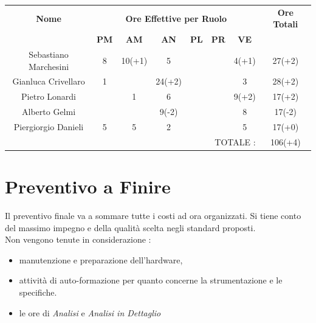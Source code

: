 \documentclass[12pt,a4paper,titlepage]{article}
\begin{document}
	{\renewcommand\arraystretch{1.2}  %
		\begin{tabular}{|c|c|c|c|c|c|c|c|}
		\hline 
		\textbf{Nome} & \multicolumn{6}{c|}{\textbf{Ore Effettive per Ruolo}} & \textbf{Ore Totali} \\ 
		& \textbf{PM} & \textbf{AM} & \textbf{AN} & \textbf{PL} & \textbf{PR} & \textbf{VE} & \\ 
		\hline
		Sebastiano Marchesini & 8 & 10(+1) & 5 &  &  & 4(+1) & 27(+2) \\ 
		\hline 
		Gianluca Crivellaro & 1 &  & 24(+2) &  &  & 3 & 28(+2) \\ 
		\hline 
		Pietro Lonardi &  & 1 & 6 &  &  & 9(+2) & 17(+2) \\ 
		\hline 
		Alberto Gelmi &  &  & 9(-2) &  &  & 8 & 17(-2) \\ 
		\hline 
		Piergiorgio Danieli & 5 & 5 & 2 &  &  & 5 & 17(+0) \\ 
		\hline 
		\multicolumn{7}{r|}{TOTALE  :} & 106(+4) \\ 
	\end{tabular}}
 
 
	
	
	\newpage
	
	\section{Preventivo a Finire}
	Il preventivo finale va a sommare tutte i costi ad ora organizzati. Si tiene conto del massimo impegno e della qualità scelta negli standard proposti. \\
	Non vengono tenute in considerazione :
	\begin{itemize}
		\item manutenzione e preparazione dell'hardware,
		\item attività di auto-formazione per quanto concerne la strumentazione e le specifiche.
		\item le ore di \textit{Analisi} e \textit{Analisi in Dettaglio}
	\end{itemize}
	
\end{document}
